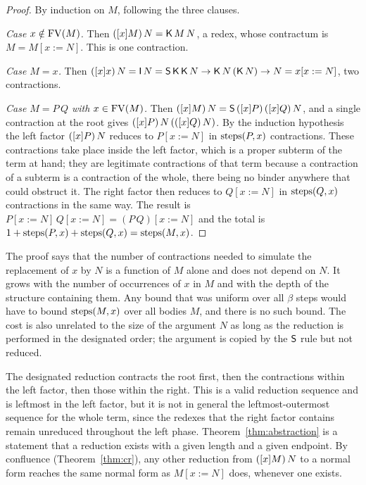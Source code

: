 \begin{proof}
By induction on $M$, following the three clauses.

\emph{Case $x\notin\mathrm{FV}(M)$.} Then $([x]M)\,N=\mathsf{K}\,M\,N$, a redex, whose contractum is $M=M[x:=N]$. This is one contraction.

\emph{Case $M=x$.} Then $([x]x)\,N=\mathsf{I}\,N=\mathsf{S}\,\mathsf{K}\,\mathsf{K}\,N\rightarrow\mathsf{K}\,N\,(\mathsf{K}\,N)\rightarrow N=x[x:=N]$, two contractions.

\emph{Case $M=P\,Q$ with $x\in\mathrm{FV}(M)$.} Then $([x]M)\,N=\mathsf{S}\,([x]P)\,([x]Q)\,N$, and a single contraction at the root gives $([x]P)\,N\,(([x]Q)\,N)$. By the induction hypothesis the left factor $([x]P)\,N$ reduces to $P[x:=N]$ in $\mathrm{steps}(P,x)$ contractions. These contractions take place inside the left factor, which is a proper subterm of the term at hand; they are legitimate contractions of that term because a contraction of a subterm is a contraction of the whole, there being no binder anywhere that could obstruct it. The right factor then reduces to $Q[x:=N]$ in $\mathrm{steps}(Q,x)$ contractions in the same way. The result is $P[x:=N]\,Q[x:=N]=(P\,Q)[x:=N]$ and the total is $1+\mathrm{steps}(P,x)+\mathrm{steps}(Q,x)=\mathrm{steps}(M,x)$.
\end{proof}

\begin{remark}
The proof says that the number of contractions needed to simulate the replacement of $x$ by $N$ is a function of $M$ alone and does not depend on $N$. It grows with the number of occurrences of $x$ in $M$ and with the depth of the structure containing them. Any bound that was uniform over all $\beta$ steps would have to bound $\mathrm{steps}(M,x)$ over all bodies $M$, and there is no such bound. The cost is also unrelated to the size of the argument $N$ as long as the reduction is performed in the designated order; the argument is copied by the $\mathsf{S}$ rule but not reduced.
\end{remark}

\begin{remark}
The designated reduction contracts the root first, then the contractions within the left factor, then those within the right. This is a valid reduction sequence and is leftmost in the left factor, but it is not in general the leftmost-outermost sequence for the whole term, since the redexes that the right factor contains remain unreduced throughout the left phase. Theorem~\ref{thm:abstraction} is a statement that a reduction exists with a given length and a given endpoint. By confluence (Theorem~\ref{thm:cr}), any other reduction from $([x]M)\,N$ to a normal form reaches the same normal form as $M[x:=N]$ does, whenever one exists.
\end{remark}

